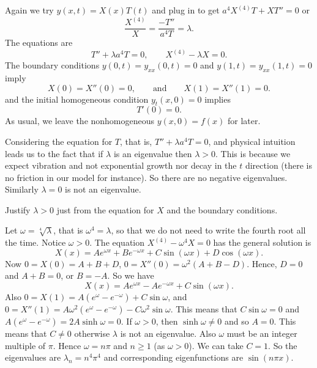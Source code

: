 Again we try $y(x,t) = X(x)T(t)$ and plug in to get
$a^4 X^{(4)}T + XT'' = 0$ or 
\begin{equation*}
\frac{X^{(4)}}{X} = \frac{- T''}{a^4T} = \lambda .
\end{equation*}
The equations are
\begin{equation*}
T'' + \lambda a^4 T = 0, \qquad
X^{(4)} - \lambda X = 0 .
\end{equation*}
The boundary conditions
$y(0,t) = y_{xx}(0,t) = 0$ and $y(1,t) = y_{xx}(1,t) = 0$ imply
\begin{equation*}
X(0) =  X''(0) = 0, \qquad \text{and} \qquad
X(1) =  X''(1) = 0 .
\end{equation*}
and the initial homogeneous condition $y_t(x,0) = 0$ implies
\begin{equation*}
T'(0) = 0 .
\end{equation*}
As usual, we leave the nonhomogeneous $y(x,0) = f(x)$ for later.

Considering the equation for $T$, that is,
$T'' + \lambda a^4 T = 0$, and physical intuition leads us
to the fact that if $\lambda$ is an eigenvalue then $\lambda > 0$.
This is because we expect vibration and not exponential growth nor
decay in the $t$ direction (there is no friction in our model for instance).
So there are no negative eigenvalues.
Similarly $\lambda = 0$ is not an eigenvalue.

\begin{exercise}
Justify $\lambda > 0$ just from the equation for $X$ and the boundary
conditions.
\end{exercise}

Let $\omega = \sqrt[4]{\lambda}$, that is $\omega^4 = \lambda$,
so that we do not need to write the fourth root
all the time.  Notice $\omega > 0$.
The equation $X^{(4)} - \omega^4 X = 0$ has the
general solution is
\begin{equation*}
X(x) = A e^{\omega x} + B e^{-\omega x} + C \sin (\omega x) +
D \cos (\omega x) .
\end{equation*}
Now $0 = X(0) = A+B+D$, $0 = X''(0) = \omega^2 (A + B - D)$.  Hence, $D = 0$ and $A+B = 0$, or $B = - A$.  So we have
\begin{equation*}
X(x) = A e^{\omega x} - A e^{-\omega x} + C \sin (\omega x) .
\end{equation*}
Also $0 = X(1) = A (e^{\omega} - e^{-\omega}) + C \sin \omega$, and
$0 = X''(1) = A \omega^2 (e^{\omega} - e^{-\omega}) - C \omega^2 \sin \omega$.
This means that $C \sin \omega  = 0$ and 
$A (e^{\omega} - e^{-\omega}) = 2 A \sinh \omega = 0$.  If $\omega > 0$, then
$\sinh \omega \not= 0$ and so $A = 0$.  This means that $C \not=0$ otherwise
$\lambda$ is not an
eigenvalue.  Also $\omega$ must be an integer multiple of
$\pi$.   Hence $\omega = n \pi$ and $n \geq 1$ (as $\omega > 0$).  We can take
$C=1$.  So the eigenvalues are $\lambda_n = n^4 \pi^4$ and corresponding eigenfunctions
are $\sin (n \pi x)$.

